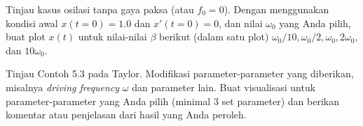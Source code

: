 \begin{soal}
Tinjau kasus osilasi tanpa gaya paksa (atau $f_0=0$).
Dengan menggunakan kondisi awal $x(t=0) = 1.0$ dan $x'(t=0) = 0$,
dan nilai $\omega_0$ yang Anda pilih,
buat plot $x(t)$ untuk nilai-nilai $\beta$ berikut (dalam satu plot)
$\omega_0/10, \omega_0/2, \omega_0, 2\omega_0$, dan $10\omega_0$.
\end{soal}


\begin{soal}
Tinjau Contoh 5.3 pada Taylor.
Modifikasi parameter-parameter yang diberikan, misalnya \textit{driving frequency} $\omega$
dan parameter lain. Buat visualisasi untuk parameter-parameter yang Anda pilih (minimal 3 set parameter)
dan berikan komentar atau penjelasan dari hasil yang Anda peroleh.
\end{soal}


